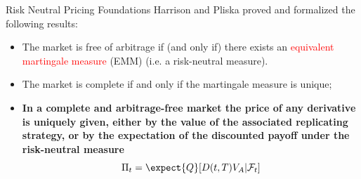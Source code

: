 \documentclass{beamer}
\begin{document}


\begin{frame}{Risk Neutral Pricing Foundations}
	Harrison and Pliska proved and formalized the following results:
	\begin{itemize}
		\item The market is free of arbitrage if (and only if) there exists an \textcolor{red}{equivalent martingale measure} (EMM) (i.e. a risk-neutral measure).
		\item The market is complete if and only if the martingale measure is unique;
		\item \textbf{In a complete and arbitrage-free market the price of any derivative is uniquely given, either by the value of the associated replicating strategy, or by the expectation of the discounted payoff under the risk-neutral measure}
		\begin{equation}
			\Pi_t = \expect{Q}[D(t,T)V_A|\mathcal{F}_t]
			\label{eq:risk_neutral_pricing}
		\end{equation}
	\end{itemize}
\end{frame}
\end{document}
